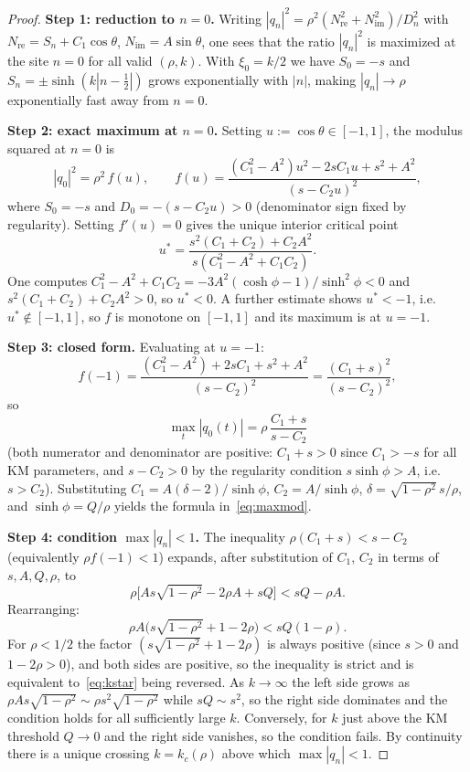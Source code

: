 \documentclass[10pt,a4paper]{amsart}
\begin{document}
\begin{proof}
\textbf{Step 1: reduction to $n=0$.}
Writing $|q_n|^2 = \rho^2(N_{\mathrm{re}}^2+N_{\mathrm{im}}^2)/D_n^2$ with
$N_{\mathrm{re}}=S_n+C_1\cos\theta$, $N_{\mathrm{im}}=A\sin\theta$, one sees
that the ratio $|q_n|^2$ is maximized at the site $n=0$ for all valid
$(\rho,k)$.  With $\xi_0=k/2$ we have $S_0=-s$ and $S_n=\pm\sinh(k|n-\tfrac{1}{2}|)$
grows exponentially with $|n|$, making $|q_n|\to\rho$ exponentially fast
away from $n=0$.
 
\textbf{Step 2: exact maximum at $n=0$.}
Setting $u:=\cos\theta\in[-1,1]$, the modulus squared at $n=0$ is
\[
  |q_0|^2 = \rho^2\,f(u), \qquad
  f(u) = \frac{(C_1^2-A^2)u^2 - 2sC_1 u + s^2+A^2}{(s-C_2 u)^2},
\]
where $S_0=-s$ and $D_0=-(s-C_2 u)>0$ (denominator sign fixed by regularity).
Setting $f'(u)=0$ gives the unique interior critical point
\[
  u^* = \frac{s^2(C_1+C_2)+C_2 A^2}{s(C_1^2-A^2+C_1 C_2)}.
\]
One computes $C_1^2-A^2+C_1C_2 = -3A^2(\cosh\phi-1)/\sinh^2\phi < 0$
and $s^2(C_1+C_2)+C_2 A^2 > 0$, so $u^*<0$.  A further estimate shows
$u^*<-1$, i.e.\ $u^*\notin[-1,1]$, so $f$ is monotone on $[-1,1]$ and
its maximum is at $u=-1$.
 
\textbf{Step 3: closed form.}
Evaluating at $u=-1$:
\[
  f(-1) = \frac{(C_1^2-A^2)+2sC_1+s^2+A^2}{(s-C_2)^2}
        = \frac{(C_1+s)^2}{(s-C_2)^2},
\]
so
\[
  \max_{t}|q_0(t)| = \rho\,\frac{C_1+s}{s-C_2}
\]
(both numerator and denominator are positive: $C_1+s>0$ since $C_1>-s$
for all KM parameters, and $s-C_2>0$ by the regularity condition
$s\sinh\phi>A$, i.e.\ $s>C_2$).
Substituting $C_1=A(\delta-2)/\sinh\phi$, $C_2=A/\sinh\phi$,
$\delta=\sqrt{1-\rho^2}\,s/\rho$, and $\sinh\phi=Q/\rho$
yields the formula in~\eqref{eq:maxmod}.
 
\textbf{Step 4: condition $\max|q_n|<1$.}
The inequality $\rho(C_1+s)<s-C_2$ (equivalently $\rho f(-1)<1$) expands,
after substitution of $C_1$, $C_2$ in terms of $s,A,Q,\rho$, to
\[
  \rho\bigl[As\sqrt{1-\rho^2}-2\rho A+sQ\bigr] < sQ-\rho A.
\]
Rearranging:
\[
  \rho A\bigl(s\sqrt{1-\rho^2}+1-2\rho\bigr) < sQ(1-\rho).
\]
For $\rho<1/2$ the factor $(s\sqrt{1-\rho^2}+1-2\rho)$ is always positive
(since $s>0$ and $1-2\rho>0$), and both sides are positive, so the
inequality is strict and is equivalent to~\eqref{eq:kstar} being reversed.
As $k\to\infty$ the left side grows as $\rho As\sqrt{1-\rho^2}\sim\rho s^2\sqrt{1-\rho^2}$
while $sQ\sim s^2$, so the right side dominates and the condition holds for
all sufficiently large $k$.
Conversely, for $k$ just above the KM threshold $Q\to 0$ and the right side
vanishes, so the condition fails.  By continuity there is a unique crossing
$k=k_c(\rho)$ above which $\max|q_n|<1$.
 

\end{proof}
\end{document}
